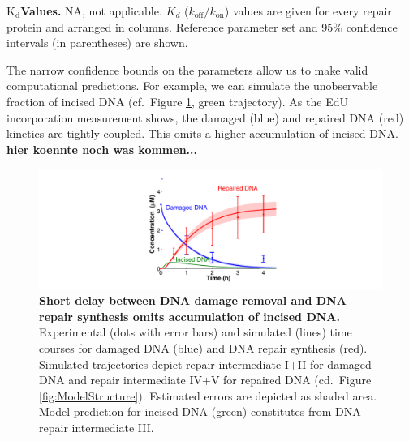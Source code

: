 \begin{landscape}
\begin{table}[t]
\begin{adjustwidth}{-1.1 cm}{}
\captionsetup{width=1.24\textwidth}
\caption{\textbf{$\text{K}_{\text{d}}$Values.} NA, not applicable. $K_d$ ($k_{\text{off}}/k_{\text{on}}$) values are given for every repair protein and arranged in columns. Reference parameter set and 95\% confidence intervals (in parentheses) are shown.}\label{tab:KdValues}
\end{adjustwidth}
\end{table}

\end{landscape}

The narrow confidence bounds on the parameters allow us to make valid computational predictions. For example, we can simulate the unobservable fraction of incised DNA (cf.\ Figure \ref{fig:ModelFit_intermed}, green trajectory). As the EdU incorporation measurement shows, the damaged (blue) and repaired DNA (red) kinetics are tightly coupled. This omits a higher accumulation of incised DNA. \textbf{hier koennte noch was kommen...}

\begin{figure}[htbp]
	\begin{center}
		\includegraphics[width=1\textwidth]{Abbildungen/figure2_7.pdf}
		\caption{\textbf{Short delay between DNA damage removal and DNA repair synthesis omits accumulation of incised DNA.} Experimental (dots with error bars) and simulated (lines) time courses for damaged DNA (blue) and DNA repair synthesis (red). Simulated trajectories depict repair intermediate I+II for damaged DNA and repair intermediate IV+V for repaired DNA (cd.\ Figure \ref{fig:ModelStructure}). Estimated errors are depicted as shaded area. Model prediction for incised DNA (green) constitutes from DNA repair intermediate III. }
		\label{fig:ModelFit_intermed}
	\end{center}
\end{figure}
